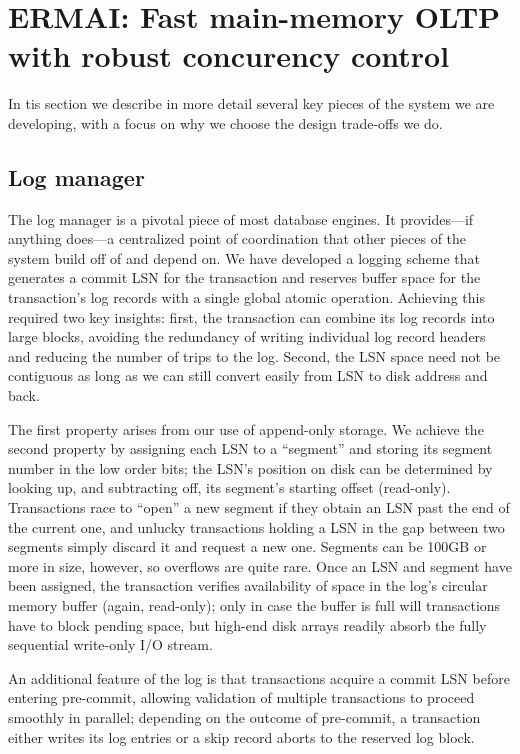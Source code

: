 
\section{ERMAI: Fast main-memory OLTP with robust concurency control}

In tis section we describe in more detail several key pieces of the system we are developing, with a focus on why we choose the design trade-offs we do.

\subsection{Log manager}

The log manager is a pivotal piece of most database engines. It provides---if anything does---a centralized point of coordination that other pieces of the system build off of and depend on. We have developed a logging scheme that  generates a commit LSN for the transaction and reserves buffer space for the transaction's log records with a single global atomic operation. Achieving this required two key insights: first, the transaction can combine its log records into large blocks, avoiding the redundancy of writing individual log record headers and reducing the number of trips to the log. Second, the LSN space need not be contiguous as long as we can still convert easily from LSN to disk address and back.

The first property arises from our use of append-only storage. We achieve the second property by assigning each LSN to a ``segment'' and storing its segment number in the low order bits; the LSN's position on disk can be determined by looking up, and subtracting off, its segment's starting offset (read-only). Transactions race to ``open'' a new segment if they obtain an LSN past the end of the current one, and unlucky transactions holding a LSN in the gap between two segments simply discard it and request a new one. Segments can be 100GB or more in size, however, so overflows are quite rare. Once an LSN and segment have been assigned, the transaction verifies availability of space in the log's circular memory buffer (again, read-only); only in case the buffer is full will transactions have to block pending space, but high-end disk arrays readily absorb the fully sequential write-only I/O stream.

An additional feature of the log is that transactions acquire a commit LSN before entering pre-commit, allowing validation of multiple transactions to proceed smoothly in parallel; depending on the outcome of pre-commit, a transaction either writes its log entries or a skip record aborts to the reserved log block.

